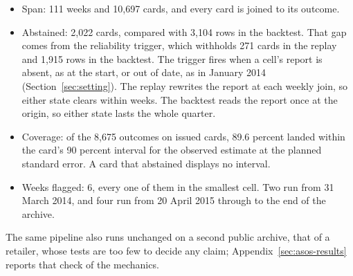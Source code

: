 \begin{itemize}
\item Span: 111 weeks and 10,697 cards, and every card is joined to its outcome.
\item Abstained: 2,022 cards, compared with 3,104 rows in the backtest. That gap comes from the reliability trigger, which withholds 271 cards in the replay and 1,915 rows in the backtest. The trigger fires when a cell's report is absent, as at the start, or out of date, as in January 2014 (Section~\ref{sec:setting}). The replay rewrites the report at each weekly join, so either state clears within weeks. The backtest reads the report once at the origin, so either state lasts the whole quarter.
\item Coverage: of the 8,675 outcomes on issued cards, 89.6 percent landed within the card's 90 percent interval for the observed estimate at the planned standard error. A card that abstained displays no interval.
\item Weeks flagged: 6, every one of them in the smallest cell. Two run from 31 March 2014, and four run from 20 April 2015 through to the end of the archive.
\end{itemize}

The same pipeline also runs unchanged on a second public archive, that of a retailer, whose tests are too few to decide any claim; Appendix~\ref{sec:asos-results} reports that check of the mechanics.

